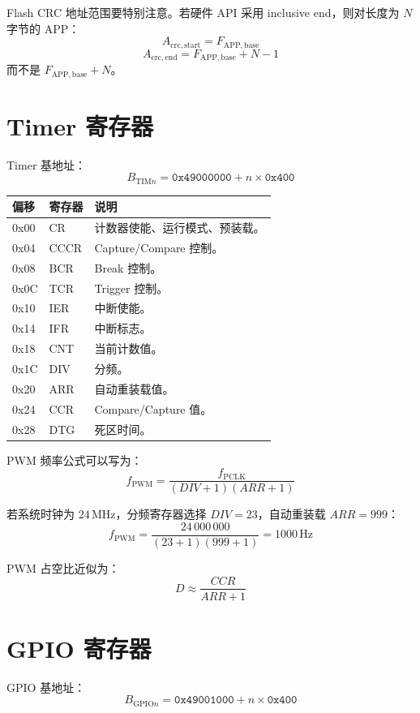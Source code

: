 \documentclass[UTF8,a4paper,11pt]{ctexart}
\newcommand{\addr}[1]{\texttt{#1}}
\begin{document}
Flash CRC 地址范围要特别注意。若硬件 API 采用 inclusive end，则对长度为 $N$ 字节的 APP：
\[
  A_{\mathrm{crc,start}} = F_{\mathrm{APP,base}}
\]
\[
  A_{\mathrm{crc,end}} = F_{\mathrm{APP,base}} + N - 1
\]
而不是 $F_{\mathrm{APP,base}} + N$。

\section{Timer 寄存器}

Timer 基地址：
\[
  B_{\mathrm{TIM}n} = \addr{0x49000000} + n \times \addr{0x400}
\]

\begin{longtable}{>{\ttfamily}p{2cm}p{3cm}p{8cm}}
\toprule
偏移 & 寄存器 & 说明 \\
\midrule
\endhead
0x00 & CR & 计数器使能、运行模式、预装载。\\
0x04 & CCCR & Capture/Compare 控制。\\
0x08 & BCR & Break 控制。\\
0x0C & TCR & Trigger 控制。\\
0x10 & IER & 中断使能。\\
0x14 & IFR & 中断标志。\\
0x18 & CNT & 当前计数值。\\
0x1C & DIV & 分频。\\
0x20 & ARR & 自动重装载值。\\
0x24 & CCR & Compare/Capture 值。\\
0x28 & DTG & 死区时间。\\
\bottomrule
\end{longtable}

PWM 频率公式可以写为：
\[
  f_{\mathrm{PWM}}
  =
  \frac{f_{\mathrm{PCLK}}}{(DIV+1)(ARR+1)}
\]

若系统时钟为 $24\,\mathrm{MHz}$，分频寄存器选择 $DIV=23$，自动重装载 $ARR=999$：
\[
  f_{\mathrm{PWM}}
  =
  \frac{24\,000\,000}{(23+1)(999+1)}
  =
  1000\,\mathrm{Hz}
\]

PWM 占空比近似为：
\[
  D \approx \frac{CCR}{ARR+1}
\]

\section{GPIO 寄存器}

GPIO 基地址：
\[
  B_{\mathrm{GPIO}n} = \addr{0x49001000} + n \times \addr{0x400}
\]
\end{document}
